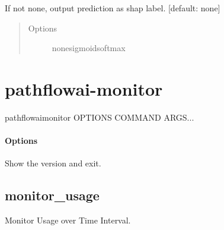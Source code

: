 \documentclass[letterpaper,10pt,english]{sphinxmanual}
\begin{document}
\begin{fulllineitems}
\label{\detokenize{index:cmdoption-pathflowai-visualize-shapley-plot-p}}
If not none, output prediction as shap label.  {[}default: none{]}
\begin{quote}\begin{description}
\item[{Options}] \leavevmode
none\textbar{}sigmoid\textbar{}softmax

\end{description}\end{quote}

\end{fulllineitems}



\chapter{pathflowai-monitor}
\label{\detokenize{index:pathflowai-monitor}}
\begin{sphinxVerbatim}[commandchars=\\\{\}]
pathflowai\PYGZhy{}monitor \PYG{o}{[}OPTIONS\PYG{o}{]} COMMAND \PYG{o}{[}ARGS\PYG{o}{]}...
\end{sphinxVerbatim}
\subsubsection*{Options}

\begin{fulllineitems}
\label{\detokenize{index:cmdoption-pathflowai-monitor-version}}
Show the version and exit.

\end{fulllineitems}



\section{monitor\_usage}
\label{\detokenize{index:pathflowai-monitor-monitor-usage}}
Monitor Usage over Time Interval.
\end{document}
